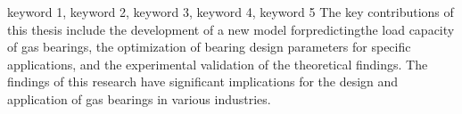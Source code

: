 

\begin{enabstract}{keyword 1, keyword 2, keyword 3, keyword 4, keyword 5}
\sloppy  %
The key contributions of this thesis include the development of a new model forpredictingthe load capacity of gas bearings, the optimization of bearing design parameters for specific applications, and the experimental validation of the theoretical findings. The findings of this research have significant implications for the design and application of gas bearings in various industries.
\end{enabstract}

